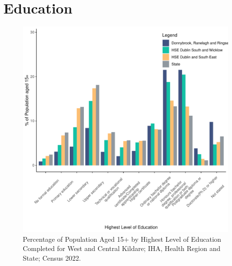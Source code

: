 \documentclass{article}
\begin{document}
\section{Education}\label{sect:Edu}
\begin{figure}[H]
	\centering
	\includegraphics[width = 120mm]{../figures/EduED.pdf}
	\caption{Percentage of Population Aged 15+ by Highest Level of Education Completed for West and Central Kildare; IHA, Health Region and State; Census 2022.}
	\label{fig:vbnv}
	\end{figure}
\end{document}
